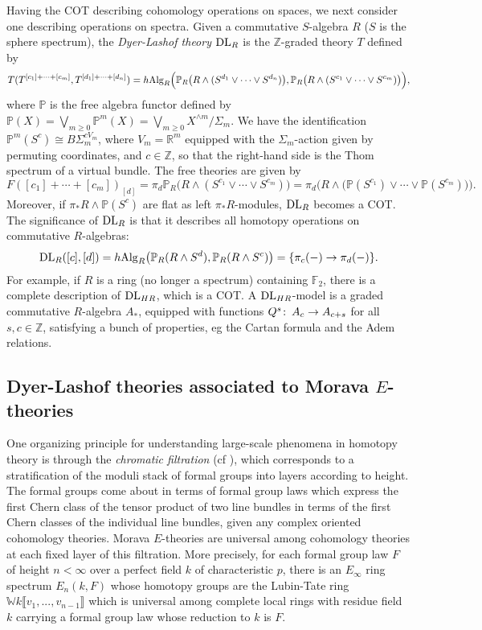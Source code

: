 \documentclass{gtpart}
\theoremstyle{definition}
\theoremstyle{remark}
\def\co{\colon\thinspace}
\newcommand{\mb}[1]{\mathbb{#1}}
\newcommand{\DL}{{\rm DL}}
\newcommand{\Alg}{{\rm Alg}}
\begin{document}
Having the COT describing cohomology operations on spaces, we next 
consider one describing operations on spectra.  Given a 
commutative $S$-algebra $R$ ($S$ is the sphere spectrum), the {\em Dyer-Lashof theory} $\DL_R$ is 
the $\mb Z$-graded theory $T$ defined by 
\[
 T(T^{[c_1]+\cdots+[c_m]},T^{[d_1]+\cdots+[d_n]}) = h\Alg_R \Big({\mb P}_R \big(R \wedge (S^{d_1} \vee \cdots \vee S^{d_n}) \big), {\mb P}_R \big(R \wedge (S^{c_1} \vee \cdots \vee S^{c_m}) \big) \Big),
\]
where $\mb P$ is the free algebra functor defined by ${\mb P}(X) = 
\bigvee_{m \geq 0} {\mb P}^m(X) = \bigvee_{m \geq 0} X^{\wedge m}/\Sigma_m$.  
We have the identification ${\mb P}^m (S^c) \cong B\Sigma_m^{cV_m}$, 
where $V_m = {\mb R}^m$ equipped with the $\Sigma_m$-action given by 
permuting coordinates, and $c \in {\mb Z}$, so that the right-hand 
side is the Thom spectrum of a virtual bundle.  The free theories 
are given by 
\[
 F([c_1]+\cdots+[c_m])_{[d]} = \pi_d {\mb P}_R \big( R \wedge (S^{c_1} \vee \cdots \vee S^{c_m}) \big) = \pi_d \Big( R \wedge \big({\mb P}(S^{c_1}) \vee \cdots \vee {\mb P}(S^{c_m})\big) \Big).
\]
Moreover, if $\pi_*R\wedge{\mb P}(S^c)$ are flat as left $\pi_*R$-modules, $\DL_R$ becomes a COT.  
The significance of $\DL_R$ is that it describes all homotopy operations on commutative $R$-algebras: 
\[
 \DL_R([c],[d]) = h\Alg_R \big( {\mb P}_R(R \wedge S^d), {\mb P}_R(R \wedge S^c) \big) = \{\pi_c(-) \to \pi_d(-)\}.
\]
For example, if $R$ is a ring (no longer a spectrum) containing ${\mb F}_2$, there is a complete description of $\DL_{HR}$, which is a COT.  
A $\DL_{HR}$-model is a graded commutative $R$-algebra $A_*$, equipped with functions $Q^s\co A_c \to A_{c+s}$ for all 
$s, c \in {\mb Z}$, satisfying a bunch of properties, eg the Cartan formula and the Adem relations.  


\subsection{Dyer-Lashof theories associated to Morava $E$-theories}
\label{subsec:DL}

One organizing principle for understanding large-scale phenomena in 
homotopy theory is through the {\em chromatic filtration} (cf 
\cite{tafoverview,coctalos}), which corresponds to a stratification 
of the moduli stack of formal groups into layers according to height.  
The formal groups come about in terms of formal group laws which express the 
first Chern class of the tensor product of two line bundles in terms 
of the first Chern classes of the individual line bundles, given any 
complex oriented cohomology theories.  Morava $E$-theories are 
universal among cohomology theories at each fixed layer of this 
filtration.  More precisely, for each formal group law $F$ of height 
$n<\infty$ over a perfect field $k$ of characteristic $p$, there 
is an $E_\infty$ ring spectrum $E_n(k,F)$ whose homotopy groups are 
the Lubin-Tate ring ${\mb W}k \llbracket v_1,...,v_{n-1} \rrbracket$ 
which is universal among complete local rings with residue field $k$ 
carrying a formal group law whose reduction to $k$ is $F$.  
\end{document}
